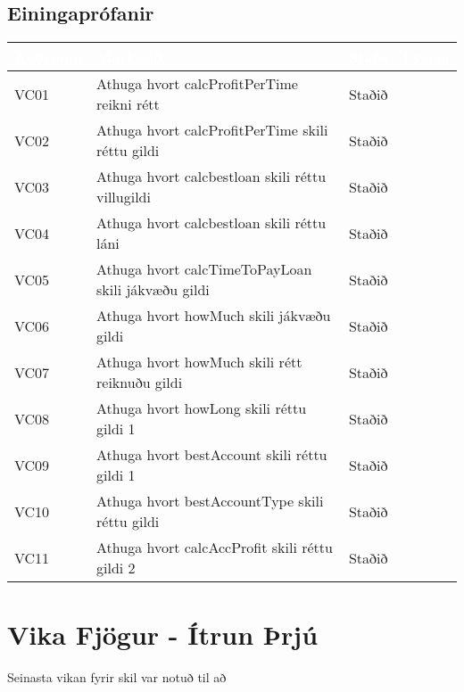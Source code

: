 \documentclass[a4paper, 12 pt]{article}
\begin{document}
\subsection{Einingaprófanir}
\begin{center}
    \begin{tabular}{| l | p{6cm} | l | l |}
    \hline
    \rowcolor{LightBlue!65}
     \textcolor{White}{Auðkenni} & \textcolor{White}{Markmið} & \textcolor{White}{Staða} & \textcolor{White}{Lýsing} \\ 
     \hline
     \hline
    \rowcolor{LightCol!30}
    VC01 & Athuga hvort calcProfitPerTime  reikni rétt & Staðið & \\ \hline
    VC02 & Athuga hvort calcProfitPerTime  skili réttu gildi & Staðið & \\ \hline
    \rowcolor{LightCol!30}
    VC03 & Athuga hvort calcbestloan  skili réttu villugildi & Staðið & \\ \hline
    VC04 & Athuga hvort calcbestloan  skili réttu láni & Staðið & \\ \hline
    \rowcolor{LightCol!30}
    VC05 & Athuga hvort calcTimeToPayLoan  skili jákvæðu gildi & Staðið & \\ \hline
    VC06 & Athuga hvort howMuch  skili jákvæðu gildi & Staðið & \\ \hline
    \rowcolor{LightCol!30}
    VC07 & Athuga hvort howMuch  skili rétt reiknuðu gildi & Staðið & \\ \hline
    VC08 & Athuga hvort howLong  skili réttu gildi 1& Staðið & \\ \hline
    \rowcolor{LightCol!30}
    VC09 & Athuga hvort bestAccount  skili réttu gildi 1 & Staðið & \\ \hline
    VC10 & Athuga hvort bestAccountType  skili réttu gildi & Staðið & \\ \hline
    \rowcolor{LightCol!30}
    VC11 & Athuga hvort calcAccProfit  skili réttu gildi 2& Staðið & \\ \hline
   
    \end{tabular}
\end{center}


\section{Vika Fjögur - Ítrun Þrjú}
Seinasta vikan fyrir skil var notuð til að 
\end{document}
